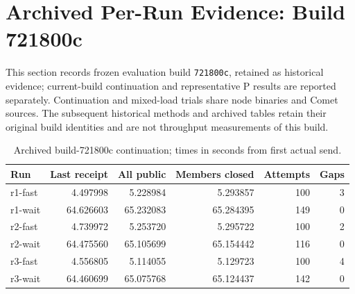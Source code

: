 \section{Archived Per-Run Evidence: Build 721800c}
\label{sec:supp-current}
This section records frozen evaluation build \texttt{721800c}, retained as historical evidence; current-build continuation and representative P results are reported separately. Continuation and mixed-load trials share node binaries and Comet sources. The subsequent historical methods and archived tables retain their original build identities and are not throughput measurements of this build.

\begin{table}[htbp]
\centering\small
\caption{Archived build-721800c continuation; times in seconds from first actual send.}
\label{tab:supp-final-chain}
\begin{tabular}{@{}lrrrrr@{}}
\toprule
Run & Last receipt & All public & Members closed & Attempts & Gaps \\
\midrule
r1-fast & 4.497998 & 5.228984 & 5.293857 & 100 & 3 \\
r1-wait & 64.626603 & 65.232083 & 65.284395 & 149 & 0 \\
r2-fast & 4.739972 & 5.253720 & 5.295722 & 100 & 2 \\
r2-wait & 64.475560 & 65.105699 & 65.154442 & 116 & 0 \\
r3-fast & 4.556805 & 5.114055 & 5.129723 & 100 & 4 \\
r3-wait & 64.460699 & 65.075768 & 65.124437 & 142 & 0 \\
\bottomrule
\end{tabular}
\end{table}
